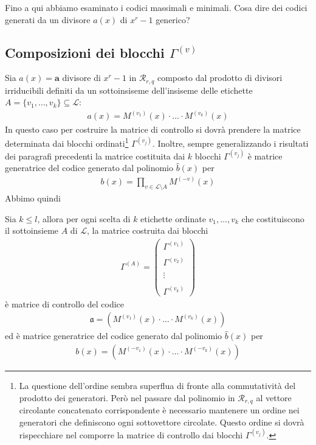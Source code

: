 Fino a qui abbiamo esaminato i codici massimali e minimali. Cosa dire dei codici generati da un divisore $a(x)$ di $x^r - 1$ generico?

\subsection{Composizioni dei blocchi $\Gamma^{(v)}$}

Sia $a(x)=\mathbf{a}$ divisore di $x^{r} - 1$ in $\mathcal{R}_{r,q} $ composto dal prodotto di divisori irriducibili definiti da un sottoinsiseme dell'insiseme delle etichette $A = \lbrace v_{1}, \dots, v_{k} \rbrace \subseteq \mathscr{L} $:
\begin{align*}
   a(x) = M^{(v_{1})}(x)\cdot \dots \cdot M^{(v_{k})}(x)
\end{align*}
In questo caso per costruire la matrice di controllo si dovrà prendere la matrice determinata dai blocchi ordinati\footnote{La questione dell'ordine sembra superflua di fronte alla commutatività del prodotto dei generatori. Però nel passare dal polinomio in $\mathcal{R}_{r,q}$ al vettore circolante concatenato corrispondente è necessario mantenere un ordine nei generatori che definiscono ogni sottovettore circolate. Questo ordine si dovrà rispecchiare nel comporre la matrice di controllo dai blocchi $\Gamma^{(v_{j})}$.} $\Gamma^{(v_{j})}$. Inoltre, sempre generalizzando i risultati dei paragrafi precedenti la matrice costituita dai $k$ blocchi $\Gamma^{(v_{j})}$ è matrice generatrice del codice generato dal polinomio $\hat{b}(x)$ per
\begin{align*}
   b(x) = \prod_{v \in \mathscr{L} \setminus A } M^{(-v)}(x)
\end{align*}
Abbimo quindi
\begin{corollario}
   Sia $k \leq l$, allora per ogni scelta di $k$ etichette ordinate $v_{1}, \dots, v_{k}$ che costituiscono il sottoinsieme $A$ di $\mathscr{L}$, la matrice costruita dai blocchi
   \begin{align*}
      \Gamma^{(A)}
      =
      \left(
      \begin{array} { c }
      \Gamma^{(v_{1})}  \\ \\
      \Gamma^{(v_{2})} \\ \\
      \vdots \\ \\
      \Gamma^{(v_{k})} 
      \end{array}
      \right)
   \end{align*}
   è matrice di controllo del codice
   \begin{align*}
    \mathfrak{a} = (  M^{(v_{1})}(x)\cdot \dots \cdot M^{(v_{k})}(x) )
  \end{align*}
  ed è matrice generatrice del codice generato dal polinomio $\hat{b}(x)$ per
  \begin{align*}
    b(x) = (  M^{(-v_{1})}(x)\cdot \dots \cdot M^{(-v_{k})}(x) )
  \end{align*}
\end{corollario}

